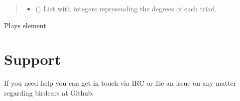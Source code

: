 \documentclass[letterpaper,10pt,english]{sphinxmanual}
\begin{document}
\begin{fulllineitems}
\begin{fulllineitems}
\begin{quote}
\begin{description}
\begin{itemize}
\item {} 
 () \textendash{} List with integers represending the degrees
of each triad.

\end{itemize}

\end{description}\end{quote}

\end{fulllineitems}


\begin{fulllineitems}
\label{\detokenize{birdears:birdears.sequence.Sequence.play}}
\end{fulllineitems}


\begin{fulllineitems}
\label{\detokenize{birdears:birdears.sequence.Sequence.play_element}}
Plays element 

\end{fulllineitems}


\end{fulllineitems}



\chapter{Support}
\label{\detokenize{index:support}}
If you need help you can get in touch via IRC or file an issue on any matter regarding birdears at Github.
\end{document}
